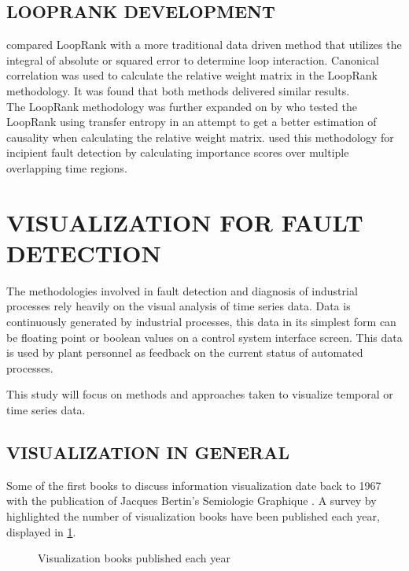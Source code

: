 \subsection{LOOPRANK DEVELOPMENT}

\cite{rahman2010new} compared LoopRank with a more traditional data driven method that utilizes the integral of absolute or squared error to determine loop interaction. Canonical correlation was used to calculate the relative weight matrix in the LoopRank methodology. It was found that both methods delivered similar results.\\ 

The LoopRank methodology was further expanded on by \cite{streicher2014eigenvector} who tested the LoopRank using transfer entropy in an attempt to get a better estimation of causality when calculating the relative weight matrix. \cite{streicher2019plant} used this methodology for incipient fault detection by calculating importance scores over multiple overlapping time regions. \\ 

\section{VISUALIZATION FOR FAULT DETECTION}

The methodologies involved in fault detection and diagnosis of industrial processes rely heavily on the visual analysis of time series data. Data is continuously generated by industrial processes, this data in its simplest form can be floating point or boolean values on a control system interface screen. This data is used by plant personnel as feedback on the current status of automated processes.

This study will focus on methods and approaches taken to visualize temporal or time series data. 

\subsection{VISUALIZATION IN GENERAL}

Some of the first books to discuss information visualization date back to 1967 with the publication of Jacques Bertin's Semiologie Graphique \cite{rees2019survey}. A survey by \cite{rees2019survey} highlighted the number of visualization books have been published each year, displayed in \ref{fig:1}.

\begin{figure}[!ht]
	
	\centering{}
	\caption{Visualization books published each year}\label{fig:1}
	
\end{figure}

